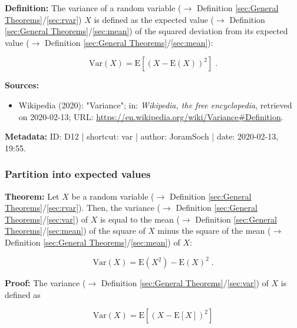 \documentclass[a4paper,12pt,twoside]{book}
\begin{document}
\textbf{Definition:} The variance of a random variable ($\rightarrow$ Definition \ref{sec:General Theorems}/\ref{sec:rvar}) $X$ is defined as the expected value ($\rightarrow$ Definition \ref{sec:General Theorems}/\ref{sec:mean}) of the squared deviation from its expected value ($\rightarrow$ Definition \ref{sec:General Theorems}/\ref{sec:mean}):

\begin{equation} \label{eq:var-var}
\mathrm{Var}(X) = \mathrm{E}\left[ (X-\mathrm{E}(X))^2 \right] \; .
\end{equation}


\vspace{1em}
\textbf{Sources:}
\begin{itemize}
\item Wikipedia (2020): "Variance"; in: \textit{Wikipedia, the free encyclopedia}, retrieved on 2020-02-13; URL: \url{https://en.wikipedia.org/wiki/Variance#Definition}.
\end{itemize}


\vspace{1em}
\textbf{Metadata:} ID: D12 | shortcut: var | author: JoramSoch | date: 2020-02-13, 19:55.
\vspace{1em}



\subsubsection[\textbf{Partition into expected values}]{Partition into expected values} \label{sec:var-mean}
\setcounter{equation}{0}

\textbf{Theorem:} Let $X$ be a random variable ($\rightarrow$ Definition \ref{sec:General Theorems}/\ref{sec:rvar}). Then, the variance ($\rightarrow$ Definition \ref{sec:General Theorems}/\ref{sec:var}) of $X$ is equal to the mean ($\rightarrow$ Definition \ref{sec:General Theorems}/\ref{sec:mean}) of the square of $X$ minus the square of the mean ($\rightarrow$ Definition \ref{sec:General Theorems}/\ref{sec:mean}) of $X$:

\begin{equation} \label{eq:var-mean-var-mean}
\mathrm{Var}(X) = \mathrm{E}(X^2) - \mathrm{E}(X)^2 \; .
\end{equation}


\vspace{1em}
\textbf{Proof:} The variance ($\rightarrow$ Definition \ref{sec:General Theorems}/\ref{sec:var}) of $X$ is defined as

\begin{equation} \label{eq:var-mean-var}
\mathrm{Var}(X) = \mathrm{E}\left[ \left( X - \mathrm{E}[X] \right)^2 \right]
\end{equation}
\end{document}
